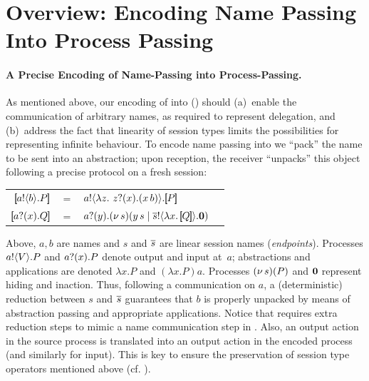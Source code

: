 \documentclass[runningheads]{llncs}
\begin{document}
{%

\section{Overview: Encoding Name Passing Into Process Passing}
\label{sec:overview}
%
\paragraph{A Precise Encoding of Name-Passing into Process-Passing.}
As mentioned above, 
our encoding of \HOp into \HO () should 
(a)~enable the communication of arbitrary names, as required to represent delegation,
and 
(b)~address the fact that linearity of session types limits the 
possibilities for representing infinite behaviour. 
To encode name passing into \HO 
we ``pack''
the name to be sent into an abstraction; 
upon reception, the receiver ``unpacks'' this object following a precise protocol on a fresh  session:
\begin{center}
\begin{tabular}{rcll}
  $[\!\![a ! \langle b \rangle . P]\!\!]$	&$=$&	$a ! \langle  \lambda z.\,\,z ? (x) . (x\, {b})  \rangle . [\!\![P]\!\!]$ \\
  $[\!\![a ? (x) . Q]\!\!]$	&$=$&	$a ? (y) . (\nu\, s)(y\, {s} \;|\; \overline{s} ! \langle \lambda x.\,[\!\![Q]\!\!] \rangle . \mathbf{0})$
\end{tabular}
\end{center}
Above, 
$a,b$ are names and $s$ and $\overline{s}$ are 
linear session names (\emph{endpoints}).
Processes $a ! \langle V \rangle . P$ and 
$a ? (x) . P$ denote output and input at~$a$;   
abstractions and applications are denoted
$\lambda x.P$ and $(\lambda x.P)a$. Processes %
$(\nu\, s)(P)$ and $\mathbf{0}$ represent hiding and inaction. %
Thus, following a communication on $a$, %
a (deterministic) reduction between  
$s$ and $\overline{s}$ guarantees that $b$ is properly unpacked by means of abstraction passing
and appropriate applications.
Notice that 
{}
requires %
extra reduction steps to mimic a name communication step in \HOp.
Also, an output action in the source process is translated into an output action in the encoded process (and similarly for input).
This is key to ensure the preservation of session type operators mentioned above (cf. ).

}
\end{document}
